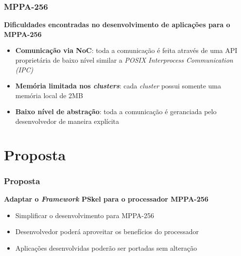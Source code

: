 \documentclass[xcolor={table}]{beamer}
\newcommand{\Fw}{\textit{Framework}\xspace}
\begin{document}
\begin{frame}\frametitle{MPPA-256}
    \textbf{Dificuldades encontradas no desenvolvimento de aplicações para o MPPA-256}

    \begin{itemize}
        \item \textbf{Comunicação via NoC}: toda a comunicação é feita através de uma API proprietária de baixo nível similar a \textit{POSIX Interprocess Communication (IPC)}
        \item \textbf{Memória limitada nos \textit{clusters}}: cada \textit{cluster} possui somente uma memória local de 2MB
        \item \textbf{Baixo nível de abstração}: toda a comunicação é geranciada pelo desenvolvedor de maneira explícita
    \end{itemize}
\end{frame}


\section{Proposta}
\begin{frame}\frametitle{Proposta}
    \textbf{Adaptar o \Fw PSkel para o processador MPPA-256}
    \begin{itemize}
        \item {Simplificar o desenvolvimento para MPPA-256}
        \item {Desenvolvedor poderá aproveitar os benefícios do processador}
        \item {Aplicações desenvolvidas poderão ser portadas sem alteração}
    \end{itemize}
\end{frame}
\end{document}
